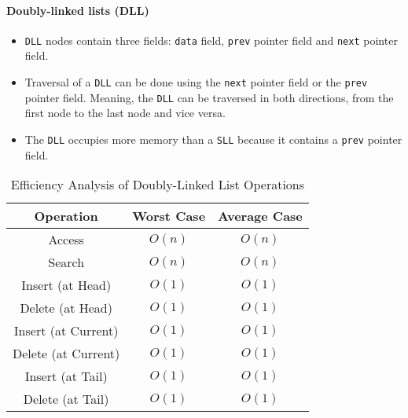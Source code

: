 \paragraph{Doubly-linked lists (DLL)}
\label{par:doubly-linked-list}
\begin{itemize}
    \item \lstinline{DLL} nodes contain three fields: \lstinline{data} field, \lstinline{prev} pointer field and \lstinline{next} pointer field.
    \item Traversal of a \lstinline{DLL} can be done using the \lstinline{next} pointer field or the \lstinline{prev} pointer field. Meaning, the \lstinline{DLL} can be traversed in both directions, from the first node to the last node and vice versa.
    \item The \lstinline{DLL} occupies more memory than a \lstinline{SLL} because it contains a \lstinline{prev} pointer field.
\end{itemize}

\begin{table}[h]
    \centering
    \caption{Efficiency Analysis of Doubly-Linked List Operations}
    \label{tab:doubly-linked-list-efficiency-analysis}
    \begin{tabular}{|c|c|c|}
        \hline
        Operation           & Worst Case & Average Case \\ \hline
        Access              & $O(n)$     & $O(n)$       \\ \hline
        Search              & $O(n)$     & $O(n)$       \\ \hline
        Insert (at Head)    & $O(1)$     & $O(1)$       \\ \hline
        Delete (at Head)    & $O(1)$     & $O(1)$       \\ \hline
        Insert (at Current) & $O(1)$     & $O(1)$       \\ \hline
        Delete (at Current) & $O(1)$     & $O(1)$       \\ \hline
        Insert (at Tail)    & $O(1)$     & $O(1)$       \\ \hline
        Delete (at Tail)    & $O(1)$     & $O(1)$       \\ \hline
    \end{tabular}
\end{table}

